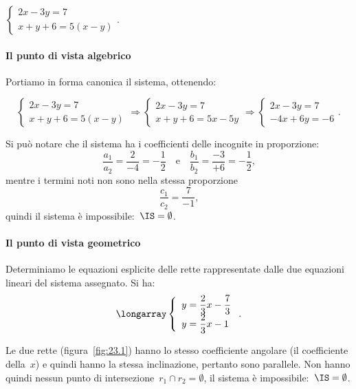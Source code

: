  \begin{exrig}
 \begin{esempio}
$\left\{\begin{array}{l}2x-3y=7 \\x+y+6=5(x-y)\end{array}\right..$

\paragraph{Il punto di vista algebrico}
Portiamo in forma canonica il sistema, ottenendo:

\begin{equation*}
\left\{\begin{array}{l}2x-3y=7 \\x+y+6=5(x-y)\end{array}\right.\Rightarrow
\left\{\begin{array}{l}2x-3y=7 \\x+y+6=5x-5y\end{array}\right.\Rightarrow
\left\{\begin{array}{l}2x-3y=7 \\-4x+6y=-6\end{array}\right..
\end{equation*}

Si può notare che il sistema ha i coefficienti delle incognite in
proporzione:
\[\frac{a_{1}}{a_{2}}=\frac{2}{-4}=-{\frac{1}{2}}\quad\text{e}\quad\frac{b_{1}}{b_{2}}=\frac{-3}{+6}=-{\frac{1}{2}}\text{,}\]
mentre i termini noti non sono nella stessa proporzione
\[\frac{c_{1}}{c_{2}}=\frac{7}{-1}\text{,}\]
quindi il sistema è impossibile:~$\IS=\emptyset $.

\paragraph{Il punto di vista geometrico}

Determiniamo le equazioni esplicite delle rette rappresentate dalle due
equazioni lineari del sistema assegnato. Si ha:
\[\longarray\left\{\begin{array}{l}y=\dfrac{2}{3}x-\dfrac{7}{3}\\y=\dfrac{2}{3}x-1\end{array}\right..\]

Le due rette (figura~\ref{fig:23.1}) hanno lo stesso coefficiente angolare (il coefficiente
della~$x$) e quindi hanno la stessa inclinazione, pertanto sono parallele.
Non hanno quindi nessun punto di intersezione~$r_{1}\cap r_{2}=\emptyset $, il sistema è impossibile:~$\IS=\emptyset $.
 \end{esempio}


\end{exrig}
